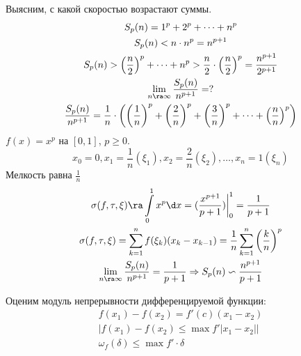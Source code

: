 \begin{exmp}
        Выясним, с какой скоростью возрастают суммы.  
	\begin{gather*}
		S_p(n) = 1^p + 2^p + \cdots + n^p \\
		S_p(n) < n \cdot n^p = n^{p+1} \\
		S_p(n) > \left(\frac{n}{2}\right)^p + \cdots + n^p > \frac{n}{2} \cdot \left(\frac{n}{2}\right)^p = \frac{n^{p+1}}{2^{p+1}} \\
		\lim_{n \ra \infty} \frac{S_p(n)}{n^{p+1}} = ? \\
		\frac{S_p(n)}{n^{p+1}} = \frac{1}{n} \cdot \left(\left(\frac{1}{n}\right)^p + \left(\frac{2}{n}\right)^p + \left(\frac{3}{n}\right)^p + \cdots + \left(\frac{n}{n}\right)^p \right)
	\end{gather*}
	$f(x) = x^p$ на $[0, 1]$, $p\ge 0$.
	\[x_0 = 0, x_1 = \frac{1}{n} (\xi_1), x_2 = \frac{2}{n} (\xi_2), \dots, x_n = 1 (\xi_n) \]
	Мелкость равна $\frac{1}{n}$
	\begin{gather*}
		\sigma(f, \tau, \xi) \ra \int\limits_0^1 x^p \d x = (\frac{x^{p+1}}{p + 1})\biggr|_0^1 = \frac1{p + 1} \\
		\sigma(f, \tau, \xi) = \sum_{k=1}^n f(\xi_k)(x_k - x_{k-1}) = \frac{1}{n} \sum_{k=1}^n \left(\frac{k}{n}\right)^p \\
		\lim_{n \ra \infty} \frac{S_p(n)}{n^{p+1}} = \frac{1}{p+1} \Rightarrow S_p(n) \backsim \frac{n^{p+1}}{p+1} \\
	\end{gather*}
\end{exmp}

Оценим модуль непрерывности дифференцируемой функции:
\begin{gather*}
	f(x_1 ) - f(x_2) = f'(c)(x_1 - x_2) \\
	|f(x_1) - f(x_2) \le \max f'|x_1 - x_2|| \\
	\omega_f(\delta) \le \max f' \cdot \delta
\end{gather*}

